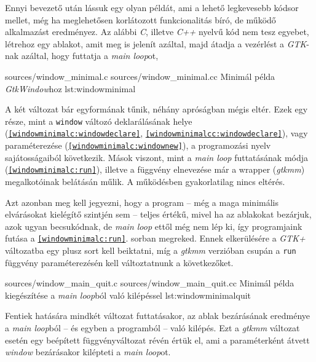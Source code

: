 Ennyi bevezető után lássuk egy olyan példát, ami a lehető legkevesebb kódsor mellet, még ha meglehetősen korlátozott funkcionalitás bíró, de működő alkalmazást eredményez. Az alábbi \textit{C}, illetve \textit{C++} nyelvű kód nem tesz egyebet, létrehoz egy ablakot, amit meg is jelenít azáltal, majd átadja a vezérlést a \textit{GTK}-nak azáltal, hogy futtatja a \textit{main loop}ot, 

\lstinputsources
{sources/window_minimal.c}
{sources/window_minimal.cc}
{Minimál példa \textit{GtkWindow}hoz}
{lst:windowminimal}

A két változat bár egyformának tűnik, néhány apróságban mégis eltér. Ezek egy része, mint a \texttt{window} változó deklarálásának helye (\texttt{\ref{windowminimalc:windowdeclare}}, \texttt{\ref{windowminimalcc:windowdeclare}}), vagy paraméterezése (\texttt{\ref{windowminimalc:windownew}}), a programozási nyelv sajátosságaiból következik. Mások viszont, mint a \textit{main loop} futtatásának módja (\texttt{\ref{windowminimalc:run}}), illetve a függvény elnevezése már a wrapper (\textit{gtkmm}) megalkotóinak belátásán műlik. A működésben gyakorlatilag nincs eltérés.

Azt azonban meg kell jegyezni, hogy a program -- még a maga minimális elvárásokat kielégítő szintjén sem -- teljes értékű, mivel ha az ablakokat bezárjuk, azok ugyan becsukódnak, de \textit{main loop} ettől még nem lép ki, így programjaink futása a \texttt{\ref{windowminimalc:run}}. sorban megreked. Ennek elkerülésére a \textit{GTK+} változatba egy plusz sort kell beiktatni, míg a \textit{gtkmm} verzióban csupán a \texttt{run} függvény paraméterezésén kell változtatnunk a következőket.

\lstinputsources
{sources/window_main_quit.c}
{sources/window_main_quit.cc}
{Minimál példa kiegészítése a \textit{main loop}ból való kilépéssel}
{lst:windowminimalquit}

Fentiek hatására mindkét változat futtatásakor, az ablak bezárásának eredménye a \textit{main loop}ból -- és egyben a programból -- való kilépés. Ezt a \textit{gtkmm} változat esetén egy beépített függvényváltozat révén értük el, ami a paraméterként átvett \textit{window} bezárásakor kilépteti a \textit{main loop}ot.

